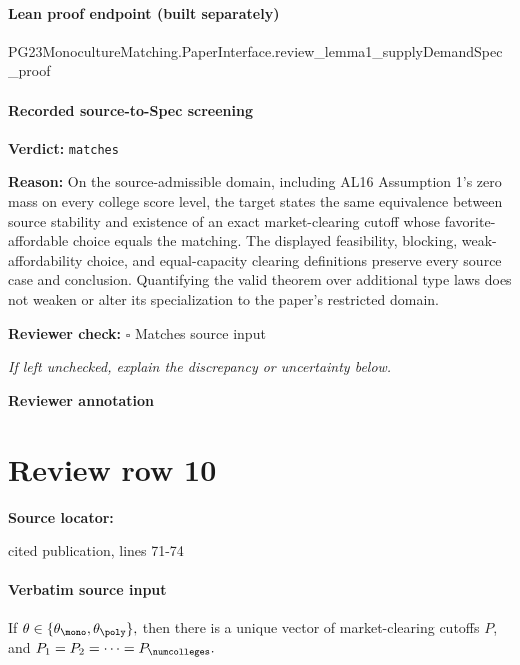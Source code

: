 \documentclass[10pt]{article}
\newcommand{\reviewerbox}{%
  \par\noindent\fbox{\parbox{0.96\linewidth}{\rule{0pt}{0.38in}}}\par
}
\newcommand{\reviewmatch}[1]{%
  \par\noindent\textbf{Reviewer check:} $\square$\; #1\par
  \noindent\emph{If left unchecked, explain the discrepancy or uncertainty below.}\par
}
\begin{document}
\paragraph{Lean proof endpoint (built separately)}\begin{ReviewVerbatim}
PG23MonocultureMatching.PaperInterface.review_lemma1_supplyDemandSpec_proof
\end{ReviewVerbatim}

\paragraph{Recorded source-to-Spec screening}
\textbf{Verdict:} \texttt{matches}
\\
{\raggedright
\textbf{Reason:} On the source-\allowbreak{}admissible domain, including AL16 Assumption 1's zero mass on every college score level, the target states the same equivalence between source stability and existence of an exact market-\allowbreak{}clearing cutoff whose favorite-\allowbreak{}affordable choice equals the matching.\allowbreak{} The displayed feasibility, blocking, weak-\allowbreak{}affordability choice, and equal-\allowbreak{}capacity clearing definitions preserve every source case and conclusion.\allowbreak{} Quantifying the valid theorem over additional type laws does not weaken or alter its specialization to the paper's restricted domain.\allowbreak{}
\par}
\reviewmatch{Matches source input}
\noindent\textbf{Reviewer annotation}\par
\reviewerbox
\clearpage
\hypertarget{source-claim-468d5f07c4682254}{}
\section*{Review row 10}
\textbf{Source locator:} {\footnotesize\raggedright cited publication, lines 71-\allowbreak{}74\par}
\paragraph{Verbatim source input}
\begin{ReviewVerbatim}
\begin{lemma}\label{prop:equal-cutoffs}
    If $\theta\in \{\theta_{\mono}, \theta_{\poly}\},$ then there is a unique vector of market-clearing cutoffs $P$, and
    $P_1 = P_2 = \cdots = P_\numcolleges.$
\end{lemma}
\end{ReviewVerbatim}
\end{document}
